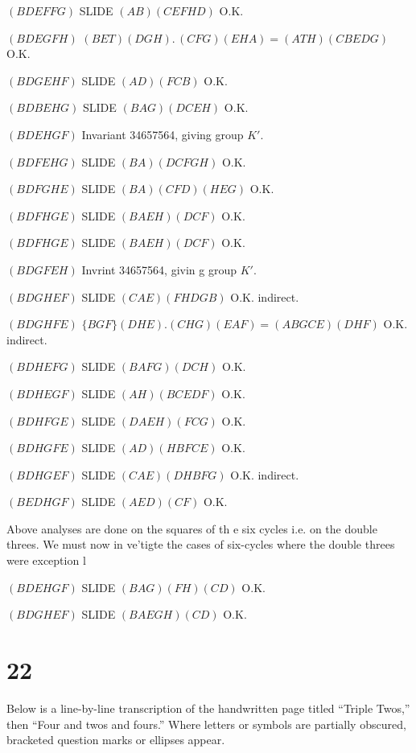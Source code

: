 \documentclass[12pt]{article}
\begin{document}
\((BDEFFG)\) \quad SLIDE \((AB)(CEFHD)\) O.K.

\((BDEGFH)\) \quad \((BET)(DGH).\,(CFG)(EHA)=(ATH)(CBEDG)\) O.K.

\((BDGEHF)\) \quad SLIDE \((AD)(FCB)\) O.K.

\((BDBEHG)\) \quad SLIDE \((BAG)(DCEH)\) O.K.

\((BDEHGF)\) \quad Invariant 34657564, giving group \(K'\).

\((BDFEHG)\) \quad SLIDE \((BA)(DCFGH)\) O.K.

\((BDFGHE)\) \quad SLIDE \((BA)(CFD)(HEG)\) O.K.

\((BDFHGE)\) \quad SLIDE \((BAEH)(DCF)\) O.K.

\((BDFHGE)\) \quad SLIDE \((BAEH)(DCF)\) O.K.

\((BDGFEH)\) \quad Invrint 34657564, givin g group \(K'\).

\((BDGHEF)\) \quad SLIDE \((CAE)(FHDGB)\) O.K. indirect.

\((BDGHFE)\) \quad \(\{BGF\}(DHE).(CHG)(EAF)=(ABGCE)(DHF)\) O.K. indirect.

\((BDHEFG)\) \quad SLIDE \((BAFG)(DCH)\) O.K.

\((BDHEGF)\) \quad SLIDE \((AH)(BCEDF)\) O.K.

\((BDHFGE)\) \quad SLIDE \((DAEH)(FCG)\) O.K.

\((BDHGFE)\) \quad SLIDE \((AD)(HBFCE)\) O.K.

\((BDHGEF)\) \quad SLIDE \((CAE)(DHBFG)\) O.K. indirect.

\((BEDHGF)\) \quad SLIDE \((AED)(CF)\) O.K.

\bigskip

Above analyses are done on the squares of th e six cycles i.e.
on the double threes. We must now in ve'tigte the cases of
six-cycles where the double threes were exception l

\bigskip

\((BDEHGF)\) \quad SLIDE \((BAG)(FH)(CD)\) O.K.

\((BDGHEF)\) \quad SLIDE \((BAEGH)(CD)\) O.K.

\section{22}

\noindent
Below is a line-by-line transcription of the handwritten page titled ``Triple Twos,'' then ``Four and twos and fours.'' 
Where letters or symbols are partially obscured, bracketed question marks or ellipses appear.
\end{document}
